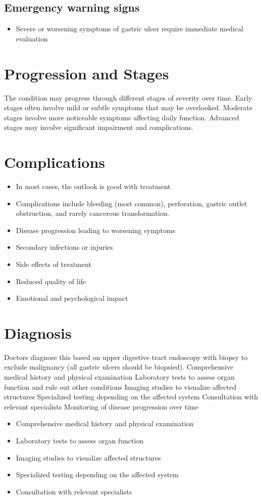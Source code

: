 \subsection{Emergency warning signs}
\begin{itemize}[noitemsep]
  \item Severe or worsening symptoms of gastric ulcer require immediate medical evaluation
\end{itemize}
\section{Progression and Stages}
The condition may progress through different stages of severity over time. Early stages often involve mild or subtle symptoms that may be overlooked. Moderate stages involve more noticeable symptoms affecting daily function. Advanced stages may involve significant impairment and complications.
\section{Complications}
\begin{itemize}[noitemsep]
  \item In most cases, the outlook is good with treatment
  \item Complications include bleeding (most common), perforation, gastric outlet obstruction, and rarely cancerous transformation.
  \item Disease progression leading to worsening symptoms
  \item Secondary infections or injuries
  \item Side effects of treatment
  \item Reduced quality of life
  \item Emotional and psychological impact
\end{itemize}
\section{Diagnosis}
Doctors diagnose this based on upper digestive tract endoscopy with biopsy to exclude malignancy (all gastric ulcers should be biopsied). Comprehensive medical history and physical examination Laboratory tests to assess organ function and rule out other conditions Imaging studies to visualize affected structures Specialized testing depending on the affected system Consultation with relevant specialists Monitoring of disease progression over time

\begin{itemize}[noitemsep]
  \item Comprehensive medical history and physical examination
  \item Laboratory tests to assess organ function
  \item Imaging studies to visualize affected structures
  \item Specialized testing depending on the affected system
  \item Consultation with relevant specialists
\end{itemize}
